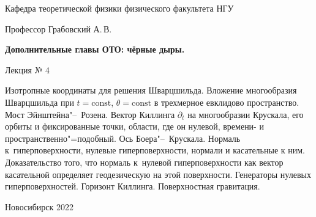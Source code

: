 \documentclass[12pt,pagesize,paper=192mm:108mm,landscape]{scrbook}
\begin{document}
\begin{titlepage}
\begin{center}
    Кафедра теоретической физики физического факультета НГУ
    \medskip

    \Large
    Профессор Грабовский А.\,В.
    \smallskip

    \Large
    \textbf{Дополнительные главы ОТО: чёрные дыры.}
    \smallskip

    \Large
    Лекция № 4
    \vfill

    \normalsize
    \begin{minipage}{0.90\linewidth}
      Изотропные координаты для решения Шварцшильда. Вложение
      многообразия Шварцшильда при $t=\text{const}$,
      $\theta=\text{const}$ в трехмерное евклидово пространство. Мост
      Эйнштейна"--~Розена. Вектор Киллинга $\partial_t$ на
      многообразии Крускала, его орбиты и фиксированные точки,
      области, где он нулевой, времени- и
      пространственно"=подобный. Ось Боера"--~Крускала. Нормаль
      к~гиперповерхности, нулевые гиперповерхности, нормали и
      касательные к ним. Доказательство того, что нормаль к~нулевой
      гиперповерхности как вектор касательной определяет геодезическую
      на этой поверхности. Генераторы нулевых
      гиперповерхностей. Горизонт Киллинга. Поверхностная гравитация.
     \end{minipage}
    \vfill

    \normalsize \ccbysa\hspace{0.5em}  Новосибирск 2022
  \end{center}
\end{titlepage}
\end{document}
